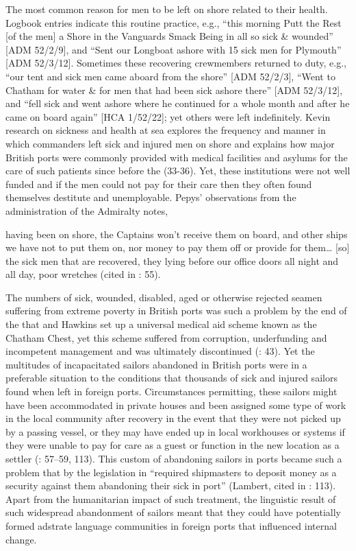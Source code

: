 The most common reason for men to be left on shore related to their health. Logbook entries indicate this routine practice, e.g., “this morning Putt the Rest [of the men] a Shore in the Vanguards Smack Being in all so sick \& wounded” [ADM 52/2/9], and “Sent our Longboat ashore with 15 sick men for Plymouth” [ADM 52/3/12]. Sometimes these recovering crewmembers returned to duty, e.g., “our tent and sick men came aboard from the shore” [ADM 52/2/3], “Went to Chatham for water \& for men that had been sick ashore there” [ADM 52/3/12], and “fell sick and went ashore where he continued for a whole month and after he came on board again” [HCA 1/52/22]; yet others were left indefinitely. Kevin  research on sickness and health at sea explores the frequency and manner in which commanders left sick and injured men on shore and explains how major British ports were commonly provided with medical facilities and asylums for the care of such patients since before the  (33-36). Yet, these institutions were not well funded and if the men could not pay for their care then they often found themselves destitute and unemployable. Pepys’ observations from the administration of the Admiralty notes, 

having been on shore, the Captains won’t receive them on board, and other ships we have not to put them on, nor money to pay them off or provide for them… [so] the sick men that are recovered, they lying before our office doors all night and all day, poor wretches (cited in \citealt{Brown2011}: 55). 

The numbers of sick, wounded, disabled, aged or otherwise rejected seamen suffering from extreme poverty in British ports was such a problem by the end of the  that  and Hawkins set up a universal medical aid scheme known as the Chatham Chest, yet this scheme suffered from corruption, underfunding and incompetent management and was ultimately discontinued (\citealt{Brown2011}: 43). Yet the multitudes of incapacitated sailors abandoned in British ports were in a preferable situation to the conditions that thousands of sick and injured sailors found when left in foreign ports. Circumstances permitting, these sailors might have been accommodated in private houses and been assigned some type of work in the local community after recovery in the event that they were not picked up by a passing vessel, or they may have ended up in local workhouses or  systems if they were unable to pay for care as a guest or function in the new location as a settler (\citealt{Brown2011}: 57--59, 113). This custom of abandoning sailors in ports became such a problem that by the  legislation in  “required shipmasters to deposit money as a security against them abandoning their sick in port” (Lambert, cited in \citealt{Brown2011}: 113). Apart from the humanitarian impact of such treatment, the linguistic result of such widespread abandonment of sailors meant that they could have potentially formed adstrate language communities in foreign ports that influenced internal change.

